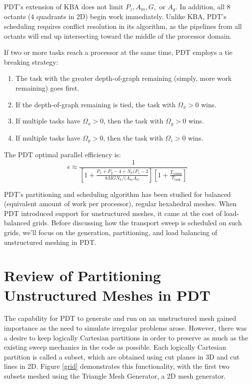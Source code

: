 \documentclass[11pt, letterpaper,titlepage,oneside]{article}
\begin{document}
PDT's extension of KBA does not limit $P_z, A_m, G,$ or $A_g$. In addition, all 8 octants (4 quadrants in 2D) begin work immediately. Unlike KBA, PDT's scheduling requires conflict resolution in its algorithm, as the pipelines from all octants will end up intersecting toward the middle of the processor domain.

If two or more tasks reach a processor at the same time, PDT employs a tie breaking strategy:

\begin{enumerate}
	\item The task with the greater depth-of-graph remaining (simply, more work remaining) goes first.
	\item If the depth-of-graph remaining is tied, the task with $\Omega_x > 0$ wins.
	\item If multiple tasks have $\Omega_x > 0$, then the task with $\Omega_y > 0$ wins.
	\item If multiple tasks have $\Omega_y > 0$, then the task with $\Omega_z > 0$ wins.
\end{enumerate}

The PDT optimal parallel efficiency\cite{mpadams2013} is:
\begin{equation}
	\epsilon \approx \frac{1}{ [1 + \frac{P_x + P_y - 4 + N_k(P_z -2}{8MGN_k/(A_m A_G} ]  [ 1 +  \frac{T_{\text{comm}}}{T_{\text{task}}} ]}
\end{equation}

PDT's partitioning and scheduling algorithm has been studied for balanced (equivalent amount of work per processor), regular hexahedral meshes. When PDT introduced support for unstructured meshes, it came at the cost of load-balanced grids. Before discussing how the transport sweep is scheduled on such grids, we'll focus on the generation, partitioning, and load balancing of unstructured meshing in PDT.

\section{Review of Partitioning Unstructured Meshes in PDT}

The capability for PDT to generate and run on an unstructured mesh gained importance as the need to simulate irregular problems arose. However, there was a desire to keep logically Cartesian partitions in order to preserve as much as the existing sweep mechanics in the code as possible. Each logically Cartesian partition is called a subset, which are obtained using cut planes in 3D and cut lines in 2D. Figure \ref{grid} demonstrates this functionality, with the first two subsets meshed using the Triangle Mesh Generator\cite{triangle}, a 2D mesh generator. 
\end{document}
